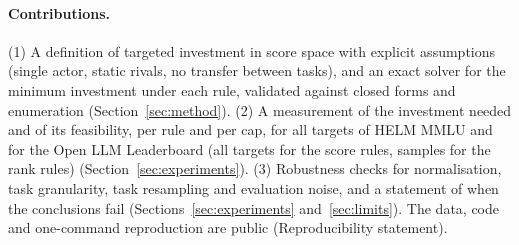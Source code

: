 \paragraph{Contributions.}
(1) A definition of targeted investment in score space with explicit assumptions (single actor, static rivals, no transfer between tasks), and an exact solver for the minimum investment under each rule, validated against closed forms and enumeration (Section~\ref{sec:method}). (2) A measurement of the investment needed and of its feasibility, per rule and per cap, for all targets of HELM MMLU and for the Open LLM Leaderboard (all targets for the score rules, samples for the rank rules) (Section~\ref{sec:experiments}). (3) Robustness checks for normalisation, task granularity, task resampling and evaluation noise, and a statement of when the conclusions fail (Sections~\ref{sec:experiments} and~\ref{sec:limits}). The data, code and one-command reproduction are public (Reproducibility statement).
